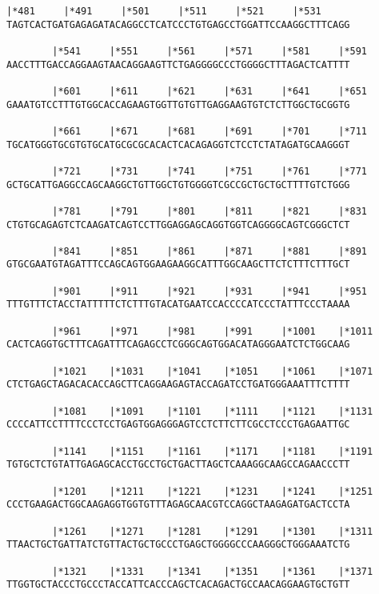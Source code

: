 \documentclass{article}
\begin{document}
\newpage
\begin{Verbatim}[fontfamily=courier]
        |*481     |*491     |*501     |*511     |*521     |*531
TAGTCACTGATGAGAGATACAGGCCTCATCCCTGTGAGCCTGGATTCCAAGGCTTTCAGG

        |*541     |*551     |*561     |*571     |*581     |*591
AACCTTTGACCAGGAAGTAACAGGAAGTTCTGAGGGGCCCTGGGGCTTTAGACTCATTTT

        |*601     |*611     |*621     |*631     |*641     |*651
GAAATGTCCTTTGTGGCACCAGAAGTGGTTGTGTTGAGGAAGTGTCTCTTGGCTGCGGTG

        |*661     |*671     |*681     |*691     |*701     |*711
TGCATGGGTGCGTGTGCATGCGCGCACACTCACAGAGGTCTCCTCTATAGATGCAAGGGT

        |*721     |*731     |*741     |*751     |*761     |*771
GCTGCATTGAGGCCAGCAAGGCTGTTGGCTGTGGGGTCGCCGCTGCTGCTTTTGTCTGGG

        |*781     |*791     |*801     |*811     |*821     |*831
CTGTGCAGAGTCTCAAGATCAGTCCTTGGAGGAGCAGGTGGTCAGGGGCAGTCGGGCTCT

        |*841     |*851     |*861     |*871     |*881     |*891
GTGCGAATGTAGATTTCCAGCAGTGGAAGAAGGCATTTGGCAAGCTTCTCTTTCTTTGCT

        |*901     |*911     |*921     |*931     |*941     |*951
TTTGTTTCTACCTATTTTTCTCTTTGTACATGAATCCACCCCATCCCTATTTCCCTAAAA

        |*961     |*971     |*981     |*991     |*1001    |*1011
CACTCAGGTGCTTTCAGATTTCAGAGCCTCGGGCAGTGGACATAGGGAATCTCTGGCAAG

        |*1021    |*1031    |*1041    |*1051    |*1061    |*1071
CTCTGAGCTAGACACACCAGCTTCAGGAAGAGTACCAGATCCTGATGGGAAATTTCTTTT

        |*1081    |*1091    |*1101    |*1111    |*1121    |*1131
CCCCATTCCTTTTCCCTCCTGAGTGGAGGGAGTCCTCTTCTTCGCCTCCCTGAGAATTGC

        |*1141    |*1151    |*1161    |*1171    |*1181    |*1191
TGTGCTCTGTATTGAGAGCACCTGCCTGCTGACTTAGCTCAAAGGCAAGCCAGAACCCTT

        |*1201    |*1211    |*1221    |*1231    |*1241    |*1251
CCCTGAAGACTGGCAAGAGGTGGTGTTTAGAGCAACGTCCAGGCTAAGAGATGACTCCTA

        |*1261    |*1271    |*1281    |*1291    |*1301    |*1311
TTAACTGCTGATTATCTGTTACTGCTGCCCTGAGCTGGGGCCCAAGGGCTGGGAAATCTG

        |*1321    |*1331    |*1341    |*1351    |*1361    |*1371
TTGGTGCTACCCTGCCCTACCATTCACCCAGCTCACAGACTGCCAACAGGAAGTGCTGTT

\end{Verbatim}
\end{document}
